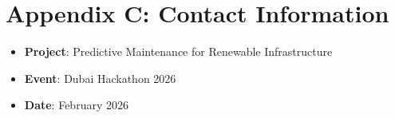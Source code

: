 \documentclass[12pt,a4paper]{article}
\begin{document}
\section{Appendix C: Contact Information}

\begin{itemize}[leftmargin=*]
    \item \textbf{Project}: Predictive Maintenance for Renewable Infrastructure
    \item \textbf{Event}: Dubai Hackathon 2026
    \item \textbf{Date}: February 2026
\end{itemize}
\end{document}
